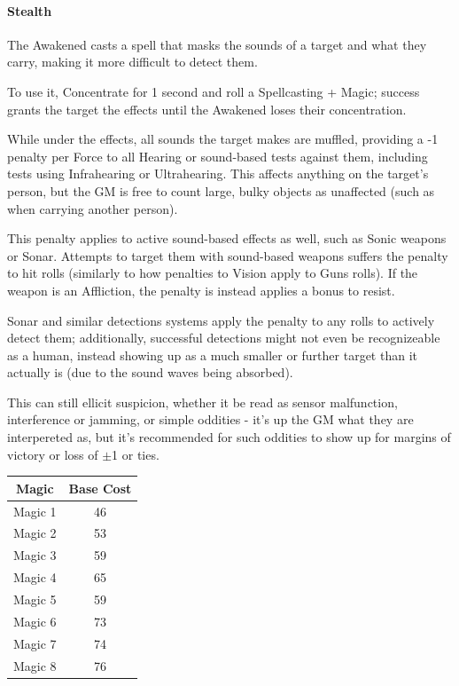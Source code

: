 \begin{multicols}{3}
	\paragraph{Stealth}
	
	The Awakened casts a spell that masks the sounds of a target and what they carry, making it more difficult to detect them.
	
	To use it, Concentrate for 1 second and roll a Spellcasting + Magic; success grants the target the effects until the Awakened loses their concentration.
	
	While under the effects, all sounds the target makes are muffled, providing a -1 penalty per Force to all Hearing or sound-based tests against them, including tests using Infrahearing or Ultrahearing. This affects anything on the target's person, but the GM is free to count large, bulky objects as unaffected (such as when carrying another person).
	
	This penalty applies to active sound-based effects as well, such as Sonic weapons or Sonar. Attempts to target them with sound-based weapons suffers the penalty to hit rolls (similarly to how penalties to Vision apply to Guns rolls). If the weapon is an Affliction, the penalty is instead applies a bonus to resist.
	
	Sonar and similar detections systems apply the penalty to any rolls to actively detect them; additionally, successful detections might not even be recognizeable as a human, instead showing up as a much smaller or further target than it actually is (due to the sound waves being absorbed). 
	
	This can still ellicit suspicion, whether it be read as sensor malfunction, interference or jamming, or simple oddities - it's up the GM what they are interpereted as, but it's recommended for such oddities to show up for margins of victory or loss of $\pm$1 or ties.
	
	\begin{center}
		\begin{tabular}{|c|c|}
			\hline
			Magic & Base Cost \\
			\hline
			\hline
			Magic 1 & 46 \\
			Magic 2 & 53 \\
			Magic 3 & 59 \\
			Magic 4 & 65 \\
			Magic 5 & 59 \\
			Magic 6 & 73 \\
			Magic 7 & 74 \\
			Magic 8 & 76 \\
			\hline
		\end{tabular}
	\end{center}
	

\end{multicols}
